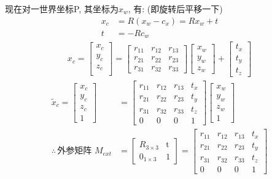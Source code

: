 现在对一世界坐标P, 其坐标为$x_w$, 有: (即旋转后平移一下)
\begin{align*}
    x_c&=R(x_w-c_x)=Rx_w+t\\
    t&=-Rc_w
\end{align*}
\begin{align*}
    x_c=\begin{bmatrix}
        x_c\\y_c\\z_c\\
    \end{bmatrix}=\begin{bmatrix}
        r_{11} & r_{12} & r_{13} \\
        r_{21} & r_{22} & r_{23} \\
        r_{31} & r_{32} & r_{33}
    \end{bmatrix}\begin{bmatrix}
        x_w\\y_w\\z_w
    \end{bmatrix}+\begin{bmatrix}
        t_x\\t_y\\t_z
    \end{bmatrix}
\end{align*}
\begin{align*}
    \tilde{x}_c=\begin{bmatrix}
        x_c\\y_c\\z_c\\1
    \end{bmatrix}&=\begin{bmatrix}
        r_{11} & r_{12} & r_{13} & t_x\\
        r_{21} & r_{22} & r_{23} & t_y\\
        r_{31} & r_{32} & r_{33} & t_z\\
        0&0&0&1
    \end{bmatrix}\begin{bmatrix}
        x_w\\y_w\\z_w\\1
    \end{bmatrix}\\
    \therefore \,  \text{外参矩阵 } M_{ext}&=\begin{bmatrix}
        R_{3\times 3}&\mathrm{t}\\
        \mathrm{0}_{1\times 3}&1
    \end{bmatrix}=\begin{bmatrix}
        r_{11} & r_{12} & r_{13} & t_x\\
        r_{21} & r_{22} & r_{23} & t_y\\
        r_{31} & r_{32} & r_{33} & t_z\\
        0&0&0&1
    \end{bmatrix}
\end{align*}

